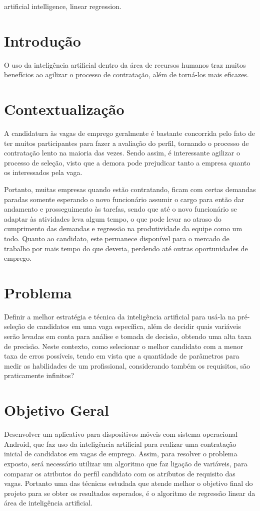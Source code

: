 \documentclass[conference]{IEEEtran}
\begin{document}
\begin{IEEEkeywords}
artificial intelligence, linear regression.
\end{IEEEkeywords}

\section{Introdução}
O uso da inteligência artificial dentro da área de recursos humanos traz muitos benefícios ao agilizar o processo de contratação, além de torná-los mais eficazes. 

\section{Contextualização}

A candidatura às vagas de emprego geralmente é bastante concorrida pelo fato de ter muitos participantes para fazer a avaliação do perfil, tornando o processo de contratação lento na maioria das vezes. Sendo assim, é interessante agilizar o processo de seleção, visto que a demora pode prejudicar tanto a empresa quanto os interessados pela vaga. 

Portanto, muitas empresas quando estão contratando, ficam com certas demandas paradas somente esperando o novo funcionário assumir o cargo para então dar andamento e prosseguimento às tarefas, sendo que até o novo funcionário se adaptar às atividades leva algum tempo, o que pode levar ao atraso do cumprimento das demandas e regressão na produtividade da equipe como um todo. Quanto ao candidato, este permanece disponível para o mercado de trabalho por mais tempo do que deveria, perdendo até outras oportunidades de emprego. 

\section{Problema}
Definir a melhor estratégia e técnica da inteligência artificial para usá-la na pré-seleção de candidatos em uma vaga específica, além de decidir quais variáveis serão levadas em conta para análise e tomada de decisão, obtendo uma alta taxa de precisão. Neste contexto, como selecionar o melhor candidato com a menor taxa de erros possíveis, tendo em vista que a quantidade de parâmetros para medir as habilidades de um profissional, considerando também os requisitos, são praticamente infinitos?

\section{Objetivo Geral}
Desenvolver um aplicativo para dispositivos móveis com sistema operacional Android, que faz uso da inteligência artificial para realizar uma contratação inicial de candidatos em vagas de emprego. Assim, para resolver o problema exposto, será necessário utilizar um algoritmo que faz ligação de variáveis, para comparar os atributos do perfil candidato com os atributos de requisito das vagas. Portanto uma das técnicas estudada que atende melhor o objetivo final do projeto para se obter os resultados esperados, é o algoritmo de regressão linear da área de inteligência artificial.
\end{document}
